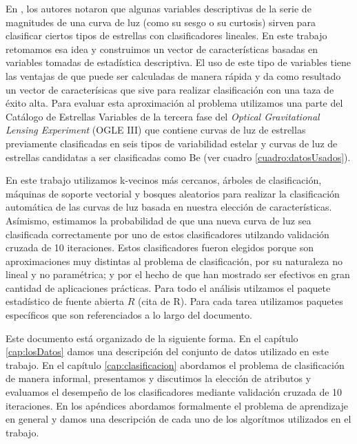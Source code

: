 \documentclass[letterpaper,12pt]{book}
\begin{document}
En \cite{rodriguez_feliciano_alisis_2012, sabogal_search_2014}, los autores notaron que algunas variables descriptivas de la serie de magnitudes de una curva de luz (como su sesgo o su curtosis) sirven para clasificar ciertos tipos de estrellas con clasificadores lineales. En este trabajo retomamos esa idea y construimos un vector de características basadas en variables tomadas de estadística descriptiva. El uso de este tipo de variables tiene las ventajas de que puede ser calculadas de manera rápida y da como resultado un vector de caracterísicas que sive para realizar clasificación con una taza de éxito alta. Para evaluar esta aproximación al problema utilizamos una parte del Catálogo de Estrellas Variables de la tercera fase del \textit{Optical Gravitational Lensing Experiment} (OGLE III)\cite{soszynski_optical_2011-2,soszynski_optical_2010,soszynski_optical_2009-1,soszynski_optical_2011,soszynski_optical_2010-2,soszynski_optical_2008-1,soszynski_optical_2013-1,soszynski_optical_2011-1,soszynski_optical_2009,pawlak_eclipsing_2013,graczyk_optical_2011,poleski_optical_2010,soszynski_optical_2013,soszynski_optical_2010-1,soszynski_optical_2008} que contiene curvas de luz  de estrellas previamente clasificadas en seis tipos de variabilidad estelar y curvas de luz de estrellas candidatas a ser clasificadas como Be (ver cuadro \ref{cuadro:datosUsados}).

En este trabajo utilizamos k-vecinos más cercanos, árboles de clasificación, máquinas de soporte vectorial y bosques aleatorios para realizar la clasificación automática de las curvas de luz basada en nuestra elección de características. Asímismo, estimamos la probabilidad de que una nueva curva de luz sea clasificada correctamente por uno de estos clasificadores utilzando validación cruzada de 10 iteraciones.  Estos clasificadores fueron elegidos porque son aproximaciones muy distintas al problema de clasificación, por su naturaleza no lineal y no paramétrica; y por el hecho de que han mostrado ser efectivos en gran cantidad de aplicaciones prácticas. Para todo el análisis utilzamos el paquete estadístico de fuente abierta $R$ (cita de R). Para cada tarea utilizamos paquetes específicos que son referenciados a lo largo del documento. 

Este documento está organizado de la siguiente forma. En el capítulo \ref{cap:losDatos} damos una descripción del conjunto de datos utilizado en este trabajo. En el capítulo \ref{cap:clasificacion} abordamos el problema de clasificación de manera informal, presentamos y discutimos la elección de atributos y evaluamos el desempeño de los clasificadores mediante validación cruzada de 10 iteraciones. En los apéndices abordamos formalmente el problema de aprendizaje en general y damos una descripción de cada uno de los algorítmos utilizados en el trabajo.
\end{document}
